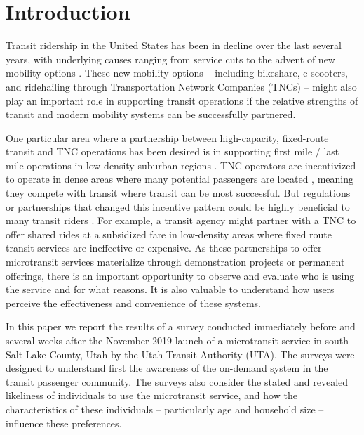 \documentclass[smartcities,article,submit,moreauthors,pdftex]{Definitions/mdpi}
\begin{document}


\section{Introduction}
Transit ridership in the United States has been in decline over the last several years, with underlying causes ranging from service cuts to the advent of new mobility options \citep{Graehler2019, Mallett2018}. These new mobility options – including bikeshare, e-scooters, and ridehailing through Transportation Network Companies (TNCs) – might also play an important role in supporting transit operations if the relative strengths of transit and modern mobility systems can be successfully partnered.

One particular area where a partnership between high-capacity, fixed-route transit and TNC operations has been desired is in supporting first mile / last mile operations in low-density suburban regions \citep{Shaheen2016, alonso2018, Kang2020}. TNC operators are incentivized to operate in dense areas where many potential passengers are located \citep{Wong2020}, meaning they compete with transit where transit can be most successful. But regulations or partnerships that changed this incentive pattern could be highly beneficial to many transit riders \citep{Ronald2017, Deakin2010}. For example, a transit agency might partner with a TNC to offer shared rides at a subsidized fare in low-density areas where fixed route transit services are ineffective or expensive. As these partnerships to offer microtransit services materialize through demonstration projects or permanent offerings, there is an important opportunity to observe and evaluate who is using the service and for what reasons. It is also valuable to understand how users perceive the effectiveness and convenience of these systems.

In this paper we report the results of a survey conducted immediately before and several weeks after the November 2019 launch of a microtransit service in south Salt Lake County, Utah by the Utah Transit Authority (UTA). The surveys were designed to understand first the awareness of the on-demand system in the transit passenger community. The surveys also consider the stated and revealed likeliness of individuals to use the microtransit service, and how the characteristics of these individuals – particularly age and household size – influence these preferences.
\end{document}
